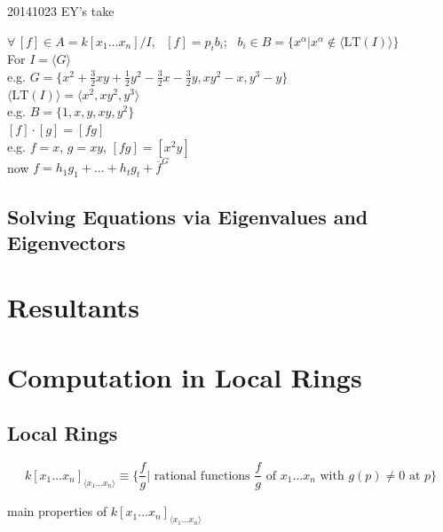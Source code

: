 20141023 EY's take

$\forall \, [f] \in A = k[x_1 \dots x_n]/I$, \, $[f] = p_ib_i$; \, $b_i \in B = \lbrace x^{\alpha} | x^{\alpha} \notin \langle \text{LT}(I) \rangle \rbrace$ \\
For $I = \langle G \rangle$ \\
\phantom{\quad } e.g. $G=\lbrace x^2 + \frac{3}{2} xy + \frac{1}{2} y^2 - \frac{3}{2} x - \frac{3}{2} y, xy^2-x, y^3-y \rbrace$ \\
$\langle \text{LT}(I) \rangle = \langle x^2, xy^2,y^3 \rangle$ \\
e.g. $B=\lbrace 1,x,y,xy,y^2\rbrace$ \\
\phantom{\quad } $[f]\cdot[g] = [fg]$ \\
e.g. $f=x, \, g=xy, \, [fg] = [x^2y]$ \\
now $f=h_1g_1 + \dots +h_tg_t+ \overline{f}^G$

\subsection{}

\subsection{Solving Equations via Eigenvalues and Eigenvectors}


\section{Resultants}

\section{Computation in Local Rings}

\subsection{Local Rings}


\begin{definition}[1.1]
  \[
k[x_1 \dots x_n]_{\langle x_1 \dots x_n \rangle} \equiv \lbrace \frac{f}{g} | \text{ rational functions } \frac{f}{g} \text{ of } x_1 \dots x_n \text{ with } g(p) \neq 0 \text{ at } p \rbrace
\]
\end{definition}

main properties of $k[x_1 \dots x_n]_{\langle x_1 \dots x_n \rangle }$


